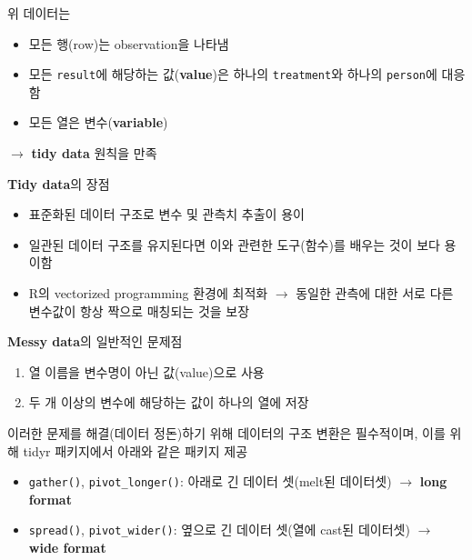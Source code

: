 \documentclass[
  11pt,
]{krantz}
\makeatletter
\providecommand{\tightlist}{%
  \setlength{\itemsep}{0pt}\setlength{\parskip}{0pt}}
\newenvironment{kframe}{%
\medskip{}
\setlength{\fboxsep}{.8em}
 \def\at@end@of@kframe{}%
 \ifinner\ifhmode%
  \def\at@end@of@kframe{\end{minipage}}%
  \begin{minipage}{\columnwidth}%
 \fi\fi%
 \def\FrameCommand##1{\hskip\@totalleftmargin \hskip-\fboxsep
 \colorbox{shadecolor}{##1}\hskip-\fboxsep
     \hskip-\linewidth \hskip-\@totalleftmargin \hskip\columnwidth}%
 \MakeFramed {\advance\hsize-\width
   \@totalleftmargin\z@ \linewidth\hsize
   \@setminipage}}%
 {\par\unskip\endMakeFramed%
 \at@end@of@kframe}
\renewenvironment{quote}{\begin{kframe}}{\end{kframe}}
\makeatother
\begin{document}
\normalsize

\begin{quote}
위 데이터는

\begin{itemize}
\tightlist
\item
  모든 행(row)는 observation을 나타냄
\item
  모든 \texttt{result}에 해당하는 값(\textbf{value})은 하나의 \texttt{treatment}와 하나의 \texttt{person}에 대응함
\item
  모든 열은 변수(\textbf{variable})
\end{itemize}

\(\rightarrow\) \textbf{tidy data} 원칙을 만족
\end{quote}

\textbf{Tidy data}의 장점

\begin{itemize}
\tightlist
\item
  표준화된 데이터 구조로 변수 및 관측치 추출이 용이
\item
  일관된 데이터 구조를 유지된다면 이와 관련한 도구(함수)를 배우는 것이 보다 용이함
\item
  R의 vectorized programming 환경에 최적화 \(\rightarrow\) 동일한 관측에 대한 서로 다른 변수값이 항상 짝으로 매칭되는 것을 보장
\end{itemize}

\textbf{Messy data}의 일반적인 문제점

\begin{enumerate}
\def\labelenumi{\arabic{enumi}.}
\tightlist
\item
  열 이름을 변수명이 아닌 값(value)으로 사용
\item
  두 개 이상의 변수에 해당하는 값이 하나의 열에 저장
\end{enumerate}

이러한 문제를 해결(데이터 정돈)하기 위해 데이터의 구조 변환은 필수적이며, 이를 위해 tidyr 패키지에서 아래와 같은 패키지 제공

\begin{itemize}
\tightlist
\item
  \texttt{gather()}, \texttt{pivot\_longer()}: 아래로 긴 데이터 셋(melt된 데이터셋) \(\rightarrow\) \textbf{long format}
\item
  \texttt{spread()}, \texttt{pivot\_wider()}: 옆으로 긴 데이터 셋(열에 cast된 데이터셋) \(\rightarrow\) \textbf{wide format}
\end{itemize}

\footnotesize
\end{document}
